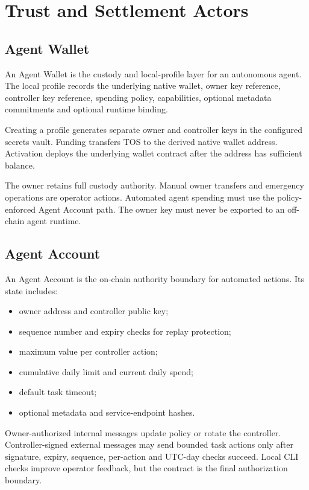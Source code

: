 \documentclass[11pt,oneside]{article}
\begin{document}
\section{Trust and Settlement Actors}

\subsection{Agent Wallet}

An Agent Wallet is the custody and local-profile layer for an autonomous agent. The local
profile records the underlying native wallet, owner key reference, controller key reference,
spending policy, capabilities, optional metadata commitments and optional runtime binding.

Creating a profile generates separate owner and controller keys in the configured secrets
vault. Funding transfers TOS to the derived native wallet address. Activation deploys the
underlying wallet contract after the address has sufficient balance.

The owner retains full custody authority. Manual owner transfers and emergency operations are
operator actions. Automated agent spending must use the policy-enforced Agent Account path.
The owner key must never be exported to an off-chain agent runtime.

\subsection{Agent Account}

An Agent Account is the on-chain authority boundary for automated actions. Its state includes:

\begin{itemize}
  \item owner address and controller public key;
  \item sequence number and expiry checks for replay protection;
  \item maximum value per controller action;
  \item cumulative daily limit and current daily spend;
  \item default task timeout;
  \item optional metadata and service-endpoint hashes.
\end{itemize}

Owner-authorized internal messages update policy or rotate the controller. Controller-signed
external messages may send bounded task actions only after signature, expiry, sequence,
per-action and UTC-day checks succeed. Local CLI checks improve operator feedback, but the
contract is the final authorization boundary.
\end{document}

